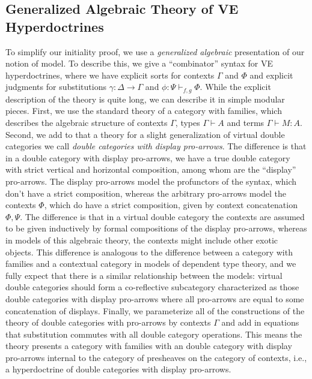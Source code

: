 \subsection{Generalized Algebraic Theory of VE Hyperdoctrines}

To simplify our initiality proof, we use a \emph{generalized
algebraic} presentation of our notion of
model\cite{cartmell,sterling-eat}. To describe this, we give a
``combinator'' syntax for VE hyperdoctrines, where we have explicit
sorts for contexts $\Gamma$ and $\Phi$ and explicit judgments for
substitutions $\gamma : \Delta \to \Gamma$ and $\phi : \Psi
\vdash_{f,g} \Phi$.
%
While the explicit description of the theory is quite long, we can
describe it in simple modular pieces.
%
First, we use the standard theory of a category with families, which
describes the algebraic structure of contexts $\Gamma$, types $\Gamma
\vdash A$ and terms $\Gamma \vdash M : A$.
%
Second, we add to that a theory for a slight generalization of virtual
double categories we call \emph{double categories with display
pro-arrows}.
%
The difference is that in a double category with display pro-arrows,
we have a true double category with strict vertical and horizontal
composition, among whom are the ``display'' pro-arrows.
%
The display pro-arrows model the profunctors of the syntax, which
don't have a strict composition, whereas the arbitrary pro-arrows
model the contexts $\Phi$, which do have a strict composition, given
by context concatenation $\Phi,\Psi$.
%
The difference is that in a virtual double category the contexts are
assumed to be given inductively by formal compositions of the display
pro-arrows, whereas in models of this algebraic theory, the contexts
might include other exotic objects.
%
This difference is analogous to the difference between a category with
families and a contextual category in models of dependent type theory,
and we fully expect that there is a similar relationship between the
models: virtual double categories should form a co-reflective
subcategory characterized as those double categories with display
pro-arrows where all pro-arrows are equal to some concatenation of
displays.
%
Finally, we parameterize all of the constructions of the theory of
double categories with pro-arrows by contexts $\Gamma$ and add in
equations that substitution commutes with all double category
operations.
%
This means the theory presents a category with families with an double
category with display pro-arrows internal to the category of
presheaves on the category of contexts, i.e., a hyperdoctrine of
double categories with display pro-arrows.

